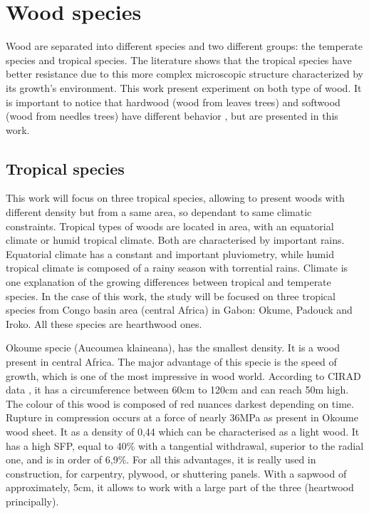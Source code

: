 \section{Wood species}

Wood are separated into different species and two different groups: the temperate species and tropical species. The literature shows that the tropical species have better resistance due to this more complex microscopic structure characterized by its growth’s environment. This work present experiment on both type of wood. It is important to notice that hardwood (wood from leaves trees) and  softwood (wood from needles trees) have different behavior \parencite{Reference2}, but are presented in this work.


\subsection{Tropical species}

This work will focus on three tropical species, allowing to present woods with different density but from a same area, so dependant to same climatic constraints. Tropical types of woods are located in area, with an equatorial climate or humid tropical climate. Both are characterised by important rains. Equatorial climate has a constant and important pluviometry, while humid tropical climate is composed of a rainy season with torrential rains. Climate is one explanation of the growing differences between tropical and temperate species. In the case of this work, the study will be focused on three tropical species from Congo basin area (central Africa) in Gabon: Okume, Padouck and Iroko. All these species are hearthwood ones. 

Okoume specie (Aucoumea klaineana), has the smallest density. It is a wood present in central Africa. The major advantage of this specie is the speed of growth, which is one of the most impressive in wood world. According to CIRAD data \parencite{Reference5}, it has a circumference between 60cm to 120cm and can reach 50m high. The colour of this wood is composed of red nuances darkest depending on time. Rupture in compression occurs at a force of nearly 36MPa as \parencite{Reference5} present in Okoume wood sheet. It as a density of 0,44 which can be characterised as a light wood. It has a high SFP, equal to 40\% with a tangential withdrawal, superior to the radial one, and is in order of 6,9\%. For all this advantages, it is really used in construction, for carpentry, plywood, or shuttering panels. With a sapwood of approximately, 5cm, it allows to work with a large part of the three (heartwood principally). 

